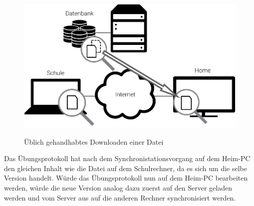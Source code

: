 \begin{figure}[H]
	\centering
  \includegraphics[]{images/dropbox_download}
	\label{dropbox_download}
  \caption{Üblich gehandhabtes Downloaden einer Datei}
\end{figure}

Das Übungsprotokoll hat nach dem Synchronistationsvorgang auf dem Heim-PC
den gleichen Inhalt wie die Datei auf dem Schulrechner, da es sich um die selbe Version
handelt. Würde das Übungsprotokoll nun auf dem Heim-PC bearbeiten werden, würde
die neue Version analog dazu zuerst auf den Server geladen werden und vom Server
aus auf die anderen Rechner synchronisiert werden.

